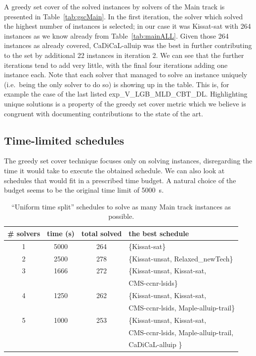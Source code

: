 \documentclass{elsarticle}
\begin{document}
A greedy set cover of the solved instances by solvers of the Main track is presented 
in Table~\ref{tab:gscMain}. In the first iteration, the solver which solved the highest number 
of instances is selected; in our case it was Kissat-sat with 264 instances
as we know already from Table~\ref{tab:mainALL}.
Given those 264 instances as already covered, CaDiCaL-alluip was the best in further contributing
to the set by additional 22 instances in iteration 2.
We can see that the further iterations tend to add very little,
with the final four iterations adding one instance each. Note that each solver
that managed to solve an instance uniquely (i.e.~being the only solver to do so)
is showing up in the table. This is, for example the case of the last listed  
exp\_V\_LGB\_MLD\_CBT\_DL.
Highlighting unique solutions is a property of the greedy set cover metric
which we believe is congruent with documenting contributions to the state of the art.

\subsection{Time-limited schedules}

The greedy set cover technique focuses only on solving instances,
disregarding the time it would take to execute the obtained schedule. We can
also look at schedules that would fit in a prescribed time budget. A natural choice
of the budget seems to be the original time limit of \SI{5000}{\second}.

\begin{table}
\caption{``Uniform time split'' schedules %
to solve as many Main track instances as possible.}
\label{tab:MainUniformTimeSplit}
\begin{center}
\begin{tabular}{cccl}
\# solvers & time (s) & total solved & the best schedule \\
\hline
1 & 5000 & 264 & \{Kissat-sat\} \\
2 & 2500 & 278 & \{Kissat-unsat, Relaxed\_newTech\} \\
3 & 1666 & 272 & \{Kissat-unsat, Kissat-sat, \\
			 &&& CMS-ccnr-lsids\} \\
4 & 1250 & 262 & \{Kissat-unsat, Kissat-sat, \\
			 &&& CMS-ccnr-lsids, Maple-alluip-trail\} \\ 
5 & 1000 & 253 & \{Kissat-unsat, Kissat-sat, \\
			&&& CMS-ccnr-lsids, Maple-alluip-trail, \\ 
			&&& CaDiCaL-alluip \}\\
\end{tabular}
\end{center}
\end{table}
\end{document}

